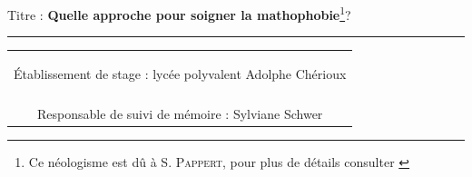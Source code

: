 {\begin{minipage}{.75\linewidth}
  \begin{center}
  {\huge Titre : \bf Quelle approche pour soigner la
  mathophobie}\footnote{Ce néologisme est dû à S. \textsc{Pappert},
  pour plus de détails consulter \cite[Chapitre 2, p.53]{papert}}? 
  \end{center}
  \end{minipage}
{\rule{\larg}{1mm}}\vspace{.7mm}
\begin{center}
\begin{tabular}{c}                
  \begin{minipage}{.75\linewidth}
  \begin{center}
  {\sc \'Etablissement de stage : lycée polyvalent Adolphe Chérioux}
  \end{center}
  \end{minipage}\\
  \\
  {\sc Responsable de suivi de mémoire :  Sylviane Schwer}
\end{tabular}
\end{center}
}
\author{Laurent \textsc{Garnier}}
\date{\today{}}

